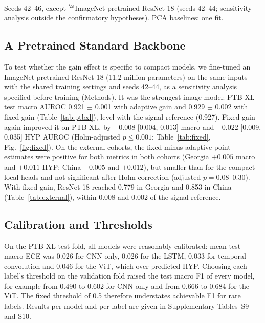 \documentclass[journal]{IEEEtran}
\begin{document}
\begin{table}[!t]
\centering
\caption{External Macro AUROC (Mean $\pm$ SD Over Seeds) and Difference From PTB-XL Test on the Same Labels ($\Delta$)}
\label{tab:external}
\\[2pt]
{\scriptsize Seeds 42--46, except $^\S$ImageNet-pretrained ResNet-18 (seeds 42--44; sensitivity analysis outside the confirmatory hypotheses). PCA baselines: one fit.\par}
\end{table}

\subsection{A Pretrained Standard Backbone}
To test whether the gain effect is specific to compact models, we fine-tuned an ImageNet-pretrained ResNet-18 \cite{he2016resnet} (11.2 million parameters) on the same inputs with the shared training settings and seeds 42--44, as a sensitivity analysis specified before training (Methods). It was the strongest image model: PTB-XL test macro AUROC 0.921 $\pm$ 0.001 with adaptive gain and 0.929 $\pm$ 0.002 with fixed gain (Table~\ref{tab:ptbxl}), level with the signal reference (0.927). Fixed gain again improved it on PTB-XL, by $+0.008$ [0.004, 0.013] macro and $+0.022$ [0.009, 0.035] HYP AUROC (Holm-adjusted $p\le0.001$; Table~\ref{tab:fixed}, Fig.~\ref{fig:fixed}). On the external cohorts, the fixed-minus-adaptive point estimates were positive for both metrics in both cohorts (Georgia $+0.005$ macro and $+0.011$ HYP; China $+0.005$ and $+0.012$), but smaller than for the compact local heads and not significant after Holm correction (adjusted $p=0.08$--$0.30$). With fixed gain, ResNet-18 reached 0.779 in Georgia and 0.853 in China (Table~\ref{tab:external}), within 0.008 and 0.002 of the signal reference.

\subsection{Calibration and Thresholds}
On the PTB-XL test fold, all models were reasonably calibrated: mean test macro ECE was 0.026 for CNN-only, 0.026 for the LSTM, 0.033 for temporal convolution and 0.046 for the ViT, which over-predicted HYP. Choosing each label's threshold on the validation fold raised the test macro F1 of every model, for example from 0.490 to 0.602 for CNN-only and from 0.666 to 0.684 for the ViT. The fixed threshold of 0.5 therefore understates achievable F1 for rare labels. Results per model and per label are given in Supplementary Tables~S9 and S10.
\end{document}
